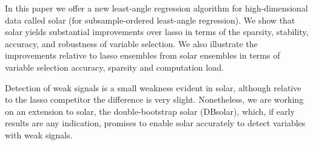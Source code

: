 \documentclass[11pt,review,authoryear]{elsarticle}
\begin{document}
In this paper we offer a new least-angle regression algorithm for high-dimensional data called solar (for subsample-ordered least-angle regression). We show that solar yields substantial improvements over lasso in terms of the sparsity, stability, accuracy, and robustness of variable selection. We also illustrate the improvements relative to lasso ensembles from solar ensembles in terms of variable selection accuracy, sparsity and computation load.

Detection of weak signals is a small weakness evident in solar, although relative to the lasso competitor the difference is very slight. Nonetheless, we are working on an extension to solar, the double-bootstrap solar (DBsolar), which, if early results are any indication, promises to enable solar accurately to detect variables with weak signals.



%


\end{document}
